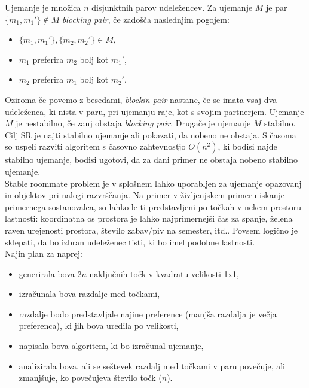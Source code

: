 \documentclass[12pt, a4paper]{article}
\begin{document}
Ujemanje je množica $n$ disjunktnih parov udeležencev.
Za ujemanje $M$ je par $\{m_{1}, m_{1}' \} \notin M$ \textit{blocking pair}, če zadošča naslednjim pogojem:
\begin{itemize}
	\item  $\{m_{1}, m_{1}' \}, \{m_{2}, m_{2}' \} \in M$,
	\item $m_1$ preferira $m_2$ bolj kot $m_1'$,
	\item $m_2$ preferira $m_1$ bolj kot $m_2'$.
\end{itemize}
Oziroma če povemo z besedami, \textit{blockin pair} nastane, če se imata vsaj dva udeleženca, ki nista v paru, pri ujemanju raje, kot s svojim partnerjem.
Ujemanje $M$ je nestabilno, če zanj obstaja \textit{blocking pair}. Drugače je ujemanje $M$ stabilno.\\

Cilj SR je najti stabilno ujemanje ali pokazati, da nobeno ne obstaja. S časoma so uspeli razviti algoritem s časovno zahtevnostjo $O(n^2)$, ki bodisi najde stabilno ujemanje, bodisi ugotovi, da za dani primer ne obstaja nobeno stabilno ujemanje.\\

Stable roommate problem je v splošnem lahko uporabljen za ujemanje opazovanj in objektov pri nalogi razvrščanja. Na primer v življenjskem primeru iskanje primernega sostanovalca, so lahko le-ti predstavljeni po točkah v nekem prostoru lastnosti: koordinatna os prostora je lahko najprimernejši čas za spanje, želena raven urejenosti prostora, število zabav/piv na semester, itd.. Povsem logično je sklepati, da bo izbran udeleženec tisti, ki bo imel podobne lastnosti. \\

\pagebreak
Najin plan za naprej:
\begin{itemize}
	\item generirala bova $2n$ naključnih točk v kvadratu velikosti 1x1,
	\item izračunala bova razdalje med točkami,
	\item razdalje bodo predstavljale najine preference (manjša razdalja je večja preferenca), ki jih bova uredila po velikosti,
	\item napisala bova algoritem, ki bo izračunal ujemanje,
	\item analizirala bova, ali se seštevek razdalj med točkami v paru povečuje, ali zmanjšuje, ko povečujeva število točk ($n$).
\end{itemize}
\end{document}
